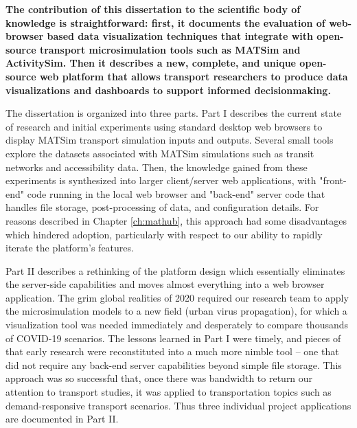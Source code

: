 \textbf{The contribution of this dissertation to the scientific body of knowledge is straightforward: first, it documents the evaluation of web-browser based data visualization techniques that integrate with open-source transport microsimulation tools such as MATSim and ActivitySim. Then it describes a new, complete, and unique open-source web platform that allows transport researchers to produce data visualizations and dashboards to support informed decisionmaking.}

The dissertation is organized into three parts. Part I describes the current state of research and initial experiments using standard desktop web browsers to display MATSim transport simulation inputs and outputs. Several small tools explore the datasets associated with MATSim simulations such as transit networks and accessibility data. Then, the knowledge gained from these experiments is synthesized into larger client/server web applications, with "front-end" code running in the local web browser and "back-end" server code that handles file storage, post-processing of data, and configuration details. For reasons described in Chapter \ref{ch:mathub}, this approach had some disadvantages which hindered adoption, particularly with respect to our ability to rapidly iterate the platform's features.

Part II describes a rethinking of the platform design which essentially eliminates the server-side capabilities and moves almost everything into a web browser application. The grim global realities of 2020 required our research team to apply the microsimulation models to a new field (urban virus propagation), for which a visualization tool was needed immediately and desperately to compare thousands of COVID-19 scenarios. The lessons learned in Part I were timely, and pieces of that early research were reconstituted into a much more nimble tool -- one that did not require any back-end server capabilities beyond simple file storage. This approach was so successful that, once there was bandwidth to return our attention to transport studies, it was applied to transportation topics such as demand-responsive transport scenarios. Thus three individual project applications are documented in Part II.

